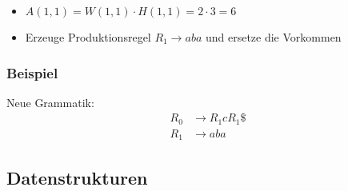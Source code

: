 \begin{frame}
\begin{figure}[H]
{
		}
	\end{figure}
	
	\begin{itemize}
		\item<2-> $A(1,1) = W(1, 1) \cdot H(1, 1) = 2 \cdot 3 = 6$
		\item<5-> Erzeuge Produktionsregel $R_1 \rightarrow aba$ und ersetze die Vorkommen
	\end{itemize}
\end{frame}

\begin{frame}
	\frametitle{Beispiel}

	Neue Grammatik:
	\begin{align*}
		R_0 &\rightarrow R_1 c R_1\$\\
		R_1 &\rightarrow aba
	\end{align*}
	
\end{frame}

\subsection{Datenstrukturen}

